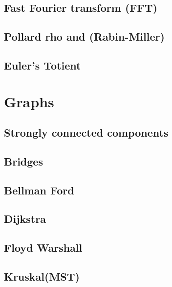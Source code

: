 \documentclass[12pt]{extarticle}
\begin{document}
\begin{multicols*}{2}
\subsection{Fast Fourier transform (FFT)} %


\subsection{Pollard rho and (Rabin-Miller)} %


\subsection{Euler's Totient} %


\section{Graphs}

\subsection{Strongly connected components} %


\subsection{Bridges} %


\subsection{Bellman Ford}


\subsection{Dijkstra}


\subsection{Floyd Warshall}


\subsection{Kruskal(MST)}



\end{multicols*}
\end{document}

